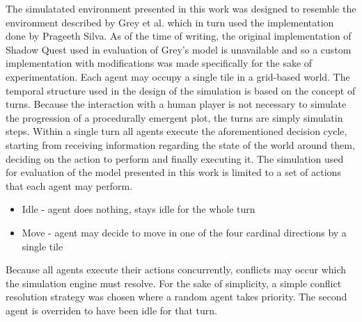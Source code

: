 The simulatated environment presented in this work was designed to resemble the environment described by Grey et al.\cite{grey2011procedural} which in turn used the implementation done by Prageeth Silva\cite{silva2010shadow}.
As of the time of writing, the original implementation of Shadow Quest used in evaluation of Grey's model is unavailable and so a custom implementation with modifications was made specifically for the sake of experimentation.
Each agent may occupy a single tile in a grid-based world.
The temporal structure used in the design of the simulation is based on the concept of turns.
Because the interaction with a human player is not necessary to simulate the progression of a procedurally emergent plot, the turns are simply simulatin steps.
Within a single turn all agents execute the aforementioned decision cycle, starting from receiving information regarding the state of the world around them, deciding on the action to perform and finally executing it.
The simulation used for evaluation of the model presented in this work is limited to a set of actions that each agent may perform.

\begin{itemize}
    \item Idle - agent does nothing, stays idle for the whole turn
    \item Move - agent may decide to move in one of the four cardinal directions by a single tile
\end{itemize}

Because all agents execute their actions concurrently, conflicts may occur which the simulation engine must resolve.
For the sake of simplicity, a simple conflict resolution strategy was chosen where a random agent takes priority.
The second agent is overriden to have been idle for that turn.




